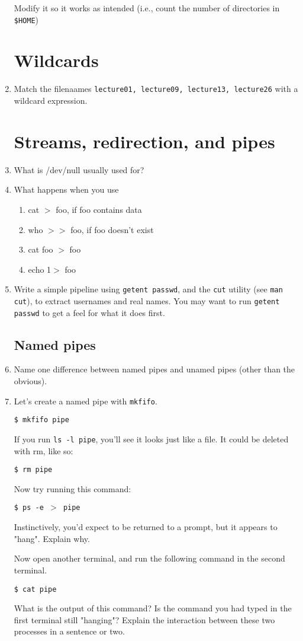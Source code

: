 \documentclass{article}
\begin{document}
\begin{enumerate}
		Modify it so it works as intended (i.e., count the number of directories in \texttt{\$HOME}) 

	\section{Wildcards} 

\item Match the filenaames \texttt{lecture01, lecture09, lecture13, lecture26} with a wildcard expression. 


		\section{Streams, redirection, and pipes} 
	
	\item What is /dev/null usually used for? 
	\item What happens when you use 
		\begin{enumerate} 
			\item cat $>$ foo, if foo contains data
			\item who $>>$ foo, if foo doesn't exist 
			\item cat foo $>$ foo 
			\item echo 1$>$ foo
		\end{enumerate}
	\item Write a simple pipeline using \texttt{getent passwd}, and the \texttt{cut} utility (see \texttt{man cut}), to extract usernames and real names. You may want to run \texttt{getent passwd} to get a feel for what it does first.
	\subsection{Named pipes} 
	\item Name one difference between named pipes and unamed pipes (other than the obvious).
	\item Let's create a named pipe with \texttt{mkfifo}. 

		\texttt{\$ mkfifo pipe} 

		If you run \texttt{ls -l pipe}, you'll see it looks just like a file. It could be deleted with rm, like so: 

		\texttt{\$ rm pipe} 


		Now try running this command: 

		\texttt{\$ ps -e \(>\) pipe} 

		Instinctively, you'd expect to be returned to a prompt, but it appears to "hang". Explain why. 


		Now open another terminal, and run the following command in the second terminal. 

		\texttt{\$ cat pipe} 

		What is the output of this command? Is the command you had typed in the first terminal still "hanging"? Explain the interaction between these two processes in a sentence or two. 

\end{enumerate}
\end{document}
